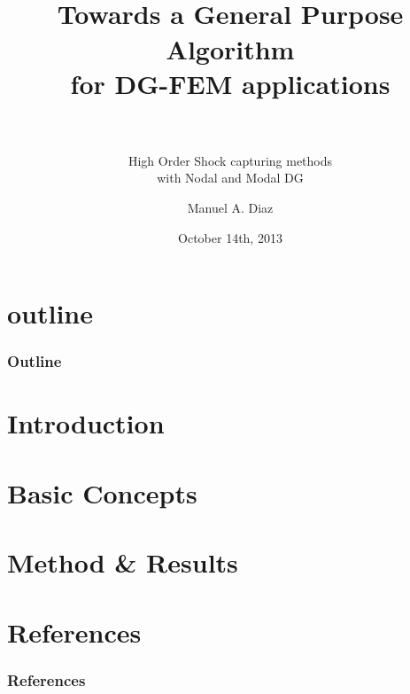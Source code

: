 

\title[NTU 2013 \hspace{4em}\insertframenumber/
\inserttotalframenumber]{~ \\ Towards a General Purpose Algorithm \\
for DG-FEM applications \\~} %
\subtitle{High Order Shock capturing methods \\ with Nodal and Modal DG}
\author[Aerodynamic Design \& Analysis Lab]{ Manuel A. Diaz} %
\date{October 14th, 2013}



\begin{frame} 
	\maketitle
\end{frame}

\section*{outline} 
\begin{frame}%
	\frametitle{Outline}
	\tableofcontents
\end{frame}

\section{Introduction}


\section{Basic Concepts}

%

\section{Method \& Results}



\section{References}
\begin{frame}[allowframebreaks]
	\frametitle{References}
	
	
\end{frame}

